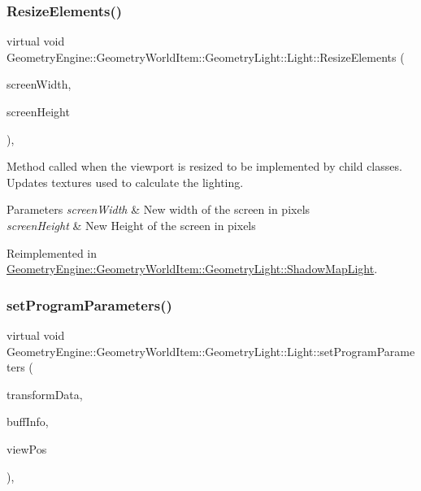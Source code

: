 \subsubsection{\texorpdfstring{ResizeElements()}{ResizeElements()}}
{\footnotesize\ttfamily virtual void Geometry\+Engine\+::\+Geometry\+World\+Item\+::\+Geometry\+Light\+::\+Light\+::\+Resize\+Elements (\begin{DoxyParamCaption}\item[{int}]{screen\+Width,  }\item[{int}]{screen\+Height }\end{DoxyParamCaption})\hspace{0.3cm}{\ttfamily [inline]}, {\ttfamily [virtual]}}

Method called when the viewport is resized to be implemented by child classes. Updates textures used to calculate the lighting. 
\begin{DoxyParams}{Parameters}
{\em screen\+Width} & New width of the screen in pixels \\
\hline
{\em screen\+Height} & New Height of the screen in pixels \\
\hline
\end{DoxyParams}


Reimplemented in \mbox{\hyperlink{class_geometry_engine_1_1_geometry_world_item_1_1_geometry_light_1_1_shadow_map_light_a3166b61bf08297eddf8b9e867c6d044a}{Geometry\+Engine\+::\+Geometry\+World\+Item\+::\+Geometry\+Light\+::\+Shadow\+Map\+Light}}.

\mbox{\label{class_geometry_engine_1_1_geometry_world_item_1_1_geometry_light_1_1_light_a108d5b6143e4c55113f7656224f9799f}} 
\subsubsection{\texorpdfstring{setProgramParameters()}{setProgramParameters()}}
{\footnotesize\ttfamily virtual void Geometry\+Engine\+::\+Geometry\+World\+Item\+::\+Geometry\+Light\+::\+Light\+::set\+Program\+Parameters (\begin{DoxyParamCaption}\item[{const \mbox{\hyperlink{class_geometry_engine_1_1_lighting_transformation_data}{Lighting\+Transformation\+Data}} \&}]{transform\+Data,  }\item[{const \mbox{\hyperlink{class_geometry_engine_1_1_buffers_info}{Buffers\+Info}} \&}]{buff\+Info,  }\item[{const Q\+Vector3D \&}]{view\+Pos }\end{DoxyParamCaption})\hspace{0.3cm}{\ttfamily [protected]}, {}}

